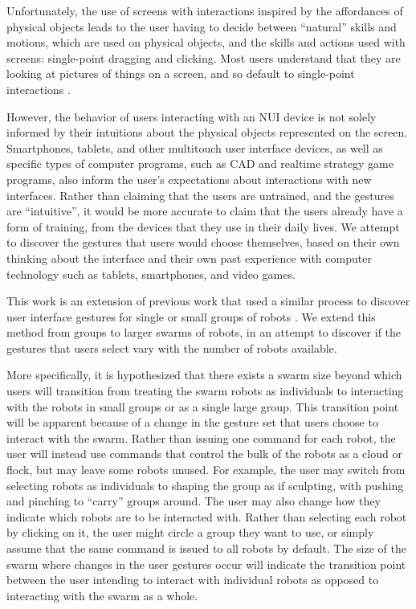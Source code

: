 Unfortunately, the use of screens with interactions inspired by the affordances of physical objects leads to the user having to decide between ``natural'' skills and motions, which are used on physical objects, and the skills and actions used with screens: single-point dragging and clicking. 
Most users understand that they are looking at pictures of things on a screen, and so default to single-point interactions \citep{vanacken2008ghosts}.

However, the behavior of users interacting with an NUI device is not solely informed by their intuitions about the physical objects represented on the screen. 
Smartphones, tablets, and other multitouch user interface devices, as well as specific types of computer programs, such as CAD and realtime strategy game programs, also inform the user's expectations about interactions with new interfaces. 
Rather than claiming that the users are untrained, and the gestures are ``intuitive'', it would be more accurate to claim that the users already have a form of training, from the devices that they use in their daily lives. 
We attempt to discover the gestures that users would choose themselves, based on their own thinking about the interface and their own past experience with computer technology such as tablets, smartphones, and video games. 

This work is an extension of previous work that used a similar process to discover user interface gestures for single or small groups of robots \citep{Micire:2009:ANG:1731903.1731912}. We extend this method from groups to larger swarms of robots, in an attempt to discover if the gestures that users select vary with the number of robots available.

More specifically, it is hypothesized that there exists a swarm size beyond which users will transition from treating the swarm robots as individuals to interacting with the robots in small groups or as a single large group. 
This transition point will be apparent because of a change in the gesture set that users choose to interact with the swarm. 
Rather than issuing one command for each robot, the user will instead use commands that control the bulk of the robots as a cloud or flock, but may leave some robots unused. 
For example, the user may switch from selecting robots as individuals to shaping the group as if sculpting, with pushing and pinching to ``carry'' groups around. 
The user may also change how they indicate which robots are to be interacted with. 
Rather than selecting each robot by clicking on it, the user might circle a group they want to use, or simply assume that the same command is issued to all robots by default. 
The size of the swarm where changes in the user gestures occur will indicate the transition point between the user intending to interact with individual robots as opposed to interacting with the swarm as a whole. 

